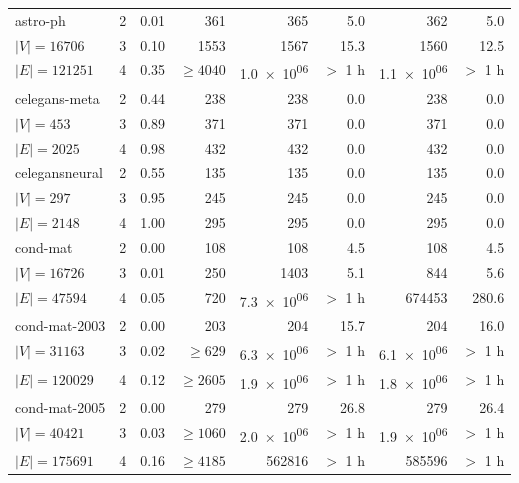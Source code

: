 \documentclass[letterpaper]{article}
\begin{document}
\begin{table}
\begin{tabular}{l c rr rr rr}
astro-ph  & 2&0.01&361&365&5.0&362&5.0\\
\hspace*{0.2em}\color{gray}$|V|{=}16706$& 3&0.10&1553&1567&15.3&1560&12.5\\
\hspace*{0.2em}\color{gray}$|E|{=}121251$& 4&0.35&${\ge}4040$&\color{gray}\num{1.0e+06}&\color{gray}$>$ 1 h&\color{gray}\num{1.1e+06}&\color{gray}$>$ 1 h\\
celegans-meta  & 2&0.44&238&238&0.0&238&0.0\\
\hspace*{0.2em}\color{gray}$|V|{=}453$& 3&0.89&371&371&0.0&371&0.0\\
\hspace*{0.2em}\color{gray}$|E|{=}2025$& 4&0.98&432&432&0.0&432&0.0\\
celegansneural  & 2&0.55&135&135&0.0&135&0.0\\
\hspace*{0.2em}\color{gray}$|V|{=}297$& 3&0.95&245&245&0.0&245&0.0\\
\hspace*{0.2em}\color{gray}$|E|{=}2148$& 4&1.00&295&295&0.0&295&0.0\\
cond-mat  & 2&0.00&108&108&4.5&108&4.5\\
\hspace*{0.2em}\color{gray}$|V|{=}16726$& 3&0.01&250&1403&5.1&844&5.6\\
\hspace*{0.2em}\color{gray}$|E|{=}47594$& 4&0.05&720&\color{gray}\num{7.3e+06}&\color{gray}$>$ 1 h&674453&280.6\\
cond-mat-2003  & 2&0.00&203&204&15.7&204&16.0\\
\hspace*{0.2em}\color{gray}$|V|{=}31163$& 3&0.02&${\ge}629$&\color{gray}\num{6.3e+06}&\color{gray}$>$ 1 h&\color{gray}\num{6.1e+06}&\color{gray}$>$ 1 h\\
\hspace*{0.2em}\color{gray}$|E|{=}120029$& 4&0.12&${\ge}2605$&\color{gray}\num{1.9e+06}&\color{gray}$>$ 1 h&\color{gray}\num{1.8e+06}&\color{gray}$>$ 1 h\\
cond-mat-2005  & 2&0.00&279&279&26.8&279&26.4\\
\hspace*{0.2em}\color{gray}$|V|{=}40421$& 3&0.03&${\ge}1060$&\color{gray}\num{2.0e+06}&\color{gray}$>$ 1 h&\color{gray}\num{1.9e+06}&\color{gray}$>$ 1 h\\
\hspace*{0.2em}\color{gray}$|E|{=}175691$& 4&0.16&${\ge}4185$&\color{gray}562816&\color{gray}$>$ 1 h&\color{gray}585596&\color{gray}$>$ 1 h\\

\end{tabular}
\end{table}
\end{document}
